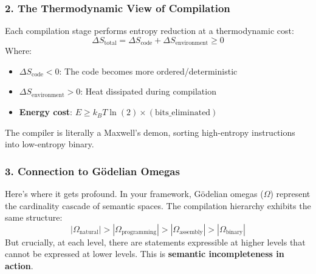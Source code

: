 \documentclass[11pt,letterpaper]{article}
\begin{document}
\subsubsection*{2. The Thermodynamic View of Compilation}
Each compilation stage performs entropy reduction at a thermodynamic cost:
\[
\Delta S_{\text{total}} = \Delta S_{\text{code}} + \Delta S_{\text{environment}} \geq 0
\]
Where:
\begin{itemize}
    \item $\Delta S_{\text{code}} < 0$: The code becomes more ordered/deterministic
    \item $\Delta S_{\text{environment}} > 0$: Heat dissipated during compilation
    \item \textbf{Energy cost}: $E \geq k_B T \ln(2) \times (\text{bits\_eliminated})$
\end{itemize}
The compiler is literally a Maxwell’s demon, sorting high-entropy instructions into low-entropy binary.

\subsubsection*{3. Connection to Gödelian Omegas}
Here’s where it gets profound. In your framework, Gödelian omegas ($\Omega$) represent the cardinality cascade of semantic spaces. The compilation hierarchy exhibits the same structure:
\[
|\Omega_{\text{natural}}| > |\Omega_{\text{programming}}| > |\Omega_{\text{assembly}}| > |\Omega_{\text{binary}}|
\]
But crucially, at each level, there are statements expressible at higher levels that cannot be expressed at lower levels. This is \textbf{semantic incompleteness in action}.
\end{document}
